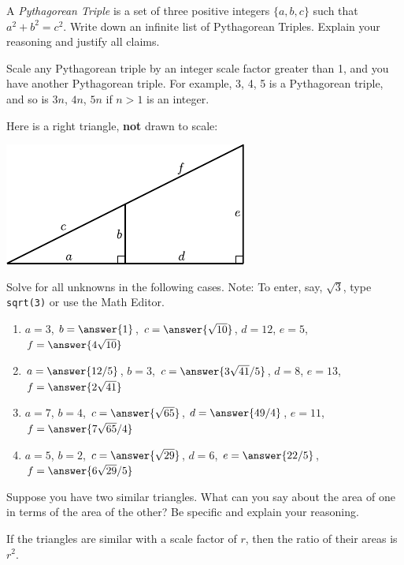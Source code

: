 \documentclass[nooutcomes]{ximera}
\begin{document}
\begin{question}
A \textit{Pythagorean Triple} is a set
  of three positive integers $\{a,b,c\}$ such that $a^2 + b^2 =
  c^2$. Write down an infinite list of Pythagorean Triples. Explain
  your reasoning and justify all claims.
\begin{freeResponse}
\begin{hint}
Scale any Pythagorean triple by an integer scale factor greater than 1, and you have another Pythagorean triple.  For example, 3, 4, 5 is a Pythagorean triple, and so is $3n$, $4n$, $5n$ if $n > 1$ is an integer.  
\end{hint}
\end{freeResponse}
\end{question}

\begin{question}
Here is a right triangle, \textbf{not} drawn to scale:
\begin{image}
\includegraphics{origamiSimQ.pdf}
\end{image}
Solve for all unknowns in the following cases.  Note:  To enter, say, $\sqrt{3}$, type \texttt{sqrt(3)} or use the Math Editor. 
\begin{enumerate}
\item $a = 3$, $b = \answer{1}$, $c = \answer{\sqrt{10}}$, $d = 12$, $e = 5$, $f = \answer{4 \sqrt{10}}$
\item $a = \answer{12/5}$, $b = 3$, $c = \answer{3\sqrt{41}/5}$, $d =8$, $e = 13$, $f = \answer{2\sqrt{41}}$
\item $a = 7$, $b = 4$, $c = \answer{\sqrt{65}}$, $d =\answer{49/4}$, $e = 11$, $f = \answer{7\sqrt{65}/4}$
\item $a = 5$, $b = 2$, $c = \answer{\sqrt{29}}$, $d =6$, $e = \answer{22/5}$, $f = \answer{6\sqrt{29}/5}$
\end{enumerate}
\end{question}

\begin{question}
Suppose you have two similar triangles. What can you say about
  the area of one in terms of the area of the other? Be specific and
  explain your reasoning.
\begin{freeResponse}
\begin{hint}
If the triangles are similar with a scale factor of $r$, then the ratio of their areas is $r^2$. 
\end{hint}
\end{freeResponse}
\end{question}
\end{document}
